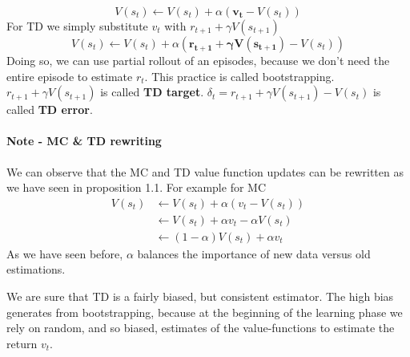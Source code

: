 \documentclass[main.tex]{subfiles}
\begin{document}
\begin{equation*}
    V(s_t) \leftarrow V(s_t) + \alpha(\mathbf{v_t}-V(s_t))
\end{equation*}
For TD we simply substitute $v_t$ with $r_{t+1} + \gamma V(s_{t+1})$
\begin{equation*}
    V(s_t) \leftarrow V(s_t) + \alpha(\mathbf{r_{t+1} + \gamma V(s_{t+1})}-V(s_t))
\end{equation*}
Doing so, we can use partial rollout of an episodes, because we don't need the entire episode to estimate $r_t$. This practice is called bootstrapping. $r_{t+1} + \gamma V(s_{t+1})$ is called \textbf{TD target}. $\delta_t = r_{t+1} + \gamma V(s_{t+1}) - V(s_t)$ is called \textbf{TD error}.
\paragraph{Note - MC \& TD rewriting} We can observe that the MC and TD value function updates can be rewritten as we have seen in proposition 1.1.
For example for MC
\begin{align*}
    V(s_t) &\leftarrow V(s_t) + \alpha(v_t-V(s_t)) \\
    & \leftarrow V(s_t) + \alpha v_t- \alpha V(s_t) \\
    & \leftarrow (1-\alpha)V(s_t) + \alpha v_t
\end{align*}
As we have seen before, $\alpha$ balances the importance of new data versus old estimations.
\newline
\par
\noindent
We are sure that TD is a fairly biased, but consistent estimator. The high bias generates from bootstrapping, because at the beginning of the learning phase we rely on random, and so biased, estimates of the value-functions to estimate the return $v_t$.
\end{document}
